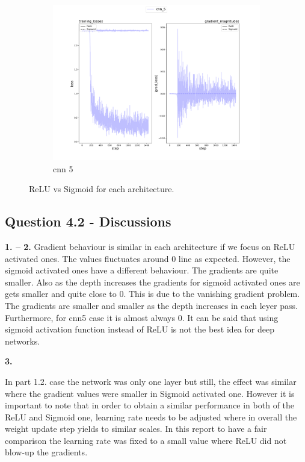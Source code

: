 \documentclass{assignment}
\begin{document}
\begin{figure}[htbp!]
\begin{subfigure}{0.3\textwidth}
        \includegraphics[width=\textwidth]{figures/part4_alpha_cnn_5.png}
        \caption{cnn 5}
    \end{subfigure}\hfill
    \caption{ReLU vs Sigmoid for each architecture.}
    \label{fig:q4_ind}
\end{figure}

\subsection{Question 4.2 - Discussions}

\textbf{1. -- 2.}
Gradient behaviour is similar in each architecture if we focus on ReLU activated ones. The values fluctuates around 0 line as expected. However, the sigmoid activated ones have a different behaviour. The gradients are quite smaller. Also as the depth increases the gradients for sigmoid activated ones are gets smaller and quite close to 0. This is due to the vanishing gradient problem. The gradients are smaller and smaller as the depth increases in each leyer pass. Furthermore, for cnn5 case it is almost always 0. It can be said that using sigmoid activation function instead of ReLU is not the best idea for deep networks.

\textbf{3.}

In part 1.2. case the network was only one layer but still, the effect was similar where the gradient values were smaller in Sigmoid activated one. However it is important to note that in order to obtain a similar performance in both of the ReLU and Sigmoid one, learning rate needs to be adjusted where in overall the weight update step yields to similar scales. In this report to have a fair comparison the learning rate was fixed to a small value where ReLU did not blow-up the gradients.
\end{document}
